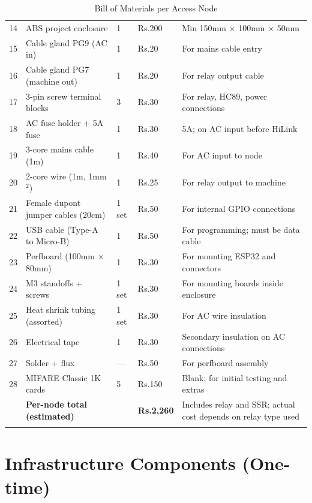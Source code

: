 \begin{longtable}{C{0.5cm}L{4.5cm}C{1.5cm}L{3cm}L{4cm}}
14 & ABS project enclosure          & 1 & Rs.200  & Min 150mm × 100mm × 50mm \\
15 & Cable gland PG9 (AC in)        & 1 & Rs.20   & For mains cable entry \\
16 & Cable gland PG7 (machine out)  & 1 & Rs.20   & For relay output cable \\
17 & 3-pin screw terminal blocks    & 3 & Rs.30   & For relay, HC89, power connections \\
18 & AC fuse holder + 5A fuse       & 1 & Rs.30   & 5A; on AC input before HiLink \\
19 & 3-core mains cable (1m)        & 1 & Rs.40   & For AC input to node \\
20 & 2-core wire (1m, 1mm$^2$)      & 1 & Rs.25   & For relay output to machine \\
21 & Female dupont jumper cables (20cm) & 1 set & Rs.50 & For internal GPIO connections \\
22 & USB cable (Type-A to Micro-B)  & 1 & Rs.50   & For programming; must be data cable \\
23 & Perfboard (100mm × 80mm)       & 1 & Rs.30   & For mounting ESP32 and connectors \\
24 & M3 standoffs + screws          & 1 set & Rs.30 & For mounting boards inside enclosure \\
25 & Heat shrink tubing (assorted)  & 1 set & Rs.30 & For AC wire insulation \\
26 & Electrical tape                & 1 & Rs.30   & Secondary insulation on AC connections \\
27 & Solder + flux                  & --- & Rs.50  & For perfboard assembly \\
28 & MIFARE Classic 1K cards        & 5 & Rs.150  & Blank; for initial testing and extras \\
\midrule
& \textbf{Per-node total (estimated)} & & \textbf{Rs.2,260} & Includes relay and SSR; actual cost depends on relay type used \\
\bottomrule
\caption{Bill of Materials per Access Node}
\label{tab:bom_node}
\end{longtable}

\section{Infrastructure Components (One-time)}

